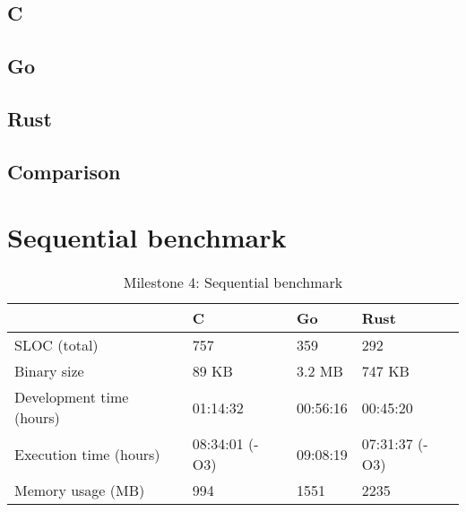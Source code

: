 \subsection{C}
\label{subsec:Implementation::Verification::C}


\subsection{Go}
\label{subsec:Implementation::Verification::Go}


\subsection{Rust}
\label{subsec:Implementation::Verification::Rust}


\subsection{Comparison}
\label{subsec:Implementation::Verification::Comparison}


\section{Sequential benchmark}
\label{sec:Implementation::SequentialBenchmark}

\begin{table}[htb]
    \centering
    \begin{tabular}{llll}
        \toprule
            & C
            & Go
            & Rust \\
        \midrule

        SLOC (total)
            & 757
            & 359
            & 292 \\

        Binary size
            & 89 KB
            & 3.2 MB
            & 747 KB \\

        Development time (hours)
            & 01:14:32
            & 00:56:16
            & 00:45:20 \\

        Execution time (hours)
            & 08:34:01 (-O3)
            & 09:08:19
            & 07:31:37 (-O3) \\

        Memory usage (MB)
            & 994
            & 1551
            & 2235 \\

        \bottomrule
    \end{tabular}
    \caption{Milestone 4: Sequential benchmark}
    \label{tb:milestone4}
\end{table}


